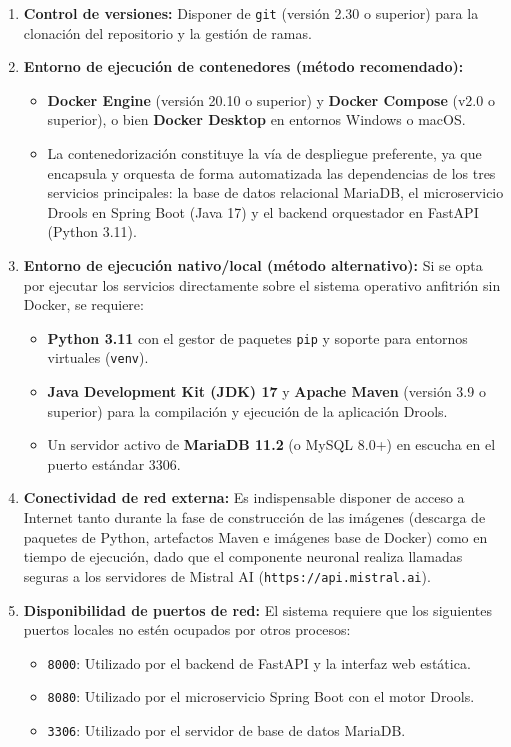 \begin{enumerate}
    \item \textbf{Control de versiones:} Disponer de \texttt{git} (versión 2.30 o superior) para la clonación del repositorio y la gestión de ramas.
    
    \item \textbf{Entorno de ejecución de contenedores (método recomendado):}
    \begin{itemize}
        \item \textbf{Docker Engine} (versión 20.10 o superior) y \textbf{Docker Compose} (v2.0 o superior), o bien \textbf{Docker Desktop} en entornos Windows o macOS.
        \item La contenedorización constituye la vía de despliegue preferente, ya que encapsula y orquesta de forma automatizada las dependencias de los tres servicios principales: la base de datos relacional MariaDB, el microservicio Drools en Spring Boot (Java 17) y el backend orquestador en FastAPI (Python 3.11).
    \end{itemize}

    \item \textbf{Entorno de ejecución nativo/local (método alternativo):} Si se opta por ejecutar los servicios directamente sobre el sistema operativo anfitrión sin Docker, se requiere:
    \begin{itemize}
        \item \textbf{Python 3.11} con el gestor de paquetes \texttt{pip} y soporte para entornos virtuales (\texttt{venv}).
        \item \textbf{Java Development Kit (JDK) 17} y \textbf{Apache Maven} (versión 3.9 o superior) para la compilación y ejecución de la aplicación Drools.
        \item Un servidor activo de \textbf{MariaDB 11.2} (o MySQL 8.0+) en escucha en el puerto estándar 3306.
    \end{itemize}

    \item \textbf{Conectividad de red externa:} Es indispensable disponer de acceso a Internet tanto durante la fase de construcción de las imágenes (descarga de paquetes de Python, artefactos Maven e imágenes base de Docker) como en tiempo de ejecución, dado que el componente neuronal realiza llamadas seguras a los servidores de Mistral AI (\texttt{https://api.mistral.ai}).

    \item \textbf{Disponibilidad de puertos de red:} El sistema requiere que los siguientes puertos locales no estén ocupados por otros procesos:
    \begin{itemize}
        \item \texttt{8000}: Utilizado por el backend de FastAPI y la interfaz web estática.
        \item \texttt{8080}: Utilizado por el microservicio Spring Boot con el motor Drools.
        \item \texttt{3306}: Utilizado por el servidor de base de datos MariaDB.
    \end{itemize}
\end{enumerate}

